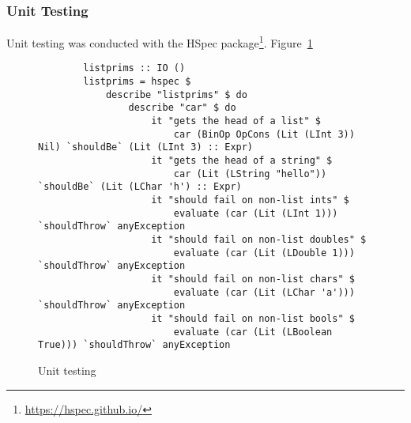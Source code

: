 \subsubsection{Unit Testing}
Unit testing was conducted with the HSpec package\footnote{\url{https://hspec.github.io/}}.
Figure~\ref{fig:unit}

\begin{landscape}
\begin{figure}
    \begin{verbatim}
        listprims :: IO ()
        listprims = hspec $ 
            describe "listprims" $ do
                describe "car" $ do
                    it "gets the head of a list" $ 
                        car (BinOp OpCons (Lit (LInt 3)) Nil) `shouldBe` (Lit (LInt 3) :: Expr)
                    it "gets the head of a string" $
                        car (Lit (LString "hello")) `shouldBe` (Lit (LChar 'h') :: Expr)
                    it "should fail on non-list ints" $ 
                        evaluate (car (Lit (LInt 1)))        `shouldThrow` anyException
                    it "should fail on non-list doubles" $ 
                        evaluate (car (Lit (LDouble 1)))     `shouldThrow` anyException
                    it "should fail on non-list chars" $ 
                        evaluate (car (Lit (LChar 'a')))     `shouldThrow` anyException
                    it "should fail on non-list bools" $ 
                        evaluate (car (Lit (LBoolean True))) `shouldThrow` anyException
    \end{verbatim}
    \caption{Unit testing}
\label{fig:unit}
\end{figure}
\end{landscape}

